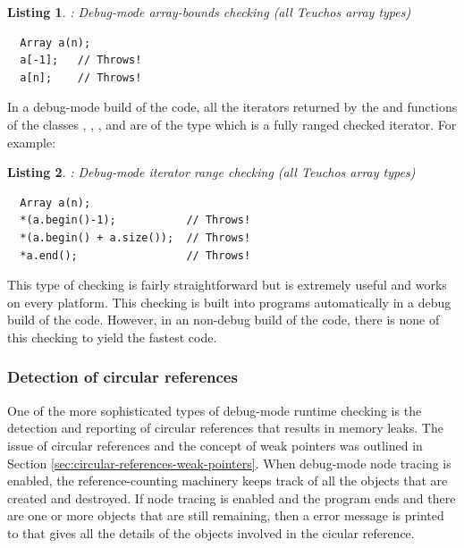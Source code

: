 \documentclass[pdf,ps2pdf,11pt]{SANDreport}
\newtheorem{listing}{Listing}
\begin{document}
\begin{listing}: Debug-mode array-bounds checking (all Teuchos array types) \\
\label{listing:array-bounds-checking}
{\small\begin{verbatim}
  Array a(n);
  a[-1];   // Throws!
  a[n];    // Throws!
\end{verbatim}}
\end{listing}

In a debug-mode build of the code, all the iterators returned by the
{} and {} functions of the classes
{}, {}, {}, and
{} are of the type {} which is a fully
ranged checked iterator.  For example:

\begin{listing}: Debug-mode iterator range checking (all Teuchos array types) \\
\label{listing:iterator-checking}
{\small\begin{verbatim}
  Array a(n);
  *(a.begin()-1);           // Throws!
  *(a.begin() + a.size());  // Throws!
  *a.end();                 // Throws!
\end{verbatim}}
\end{listing}

This type of checking is fairly straightforward but is extremely
useful and works on every platform.  This checking is built into
programs automatically in a debug build of the code.  However, in an
non-debug build of the code, there is none of this checking to yield
the fastest code.


%
{}\subsubsection{Detection of circular references}
\label{sec:detection-circular-references}
%

One of the more sophisticated types of debug-mode runtime checking is
the detection and reporting of circular {} references that
results in memory leaks.  The issue of circular references and the
concept of weak pointers was outlined in Section
{}\ref{sec:circular-references-weak-pointers}.  When debug-mode node
tracing is enabled, the reference-counting machinery keeps track of
all the {} objects that are created and destroyed.  If
node tracing is enabled and the program ends and there are one or more
{} objects that are still remaining, then a error
message is printed to {} that gives all the details
of the objects involved in the cicular reference.
\end{document}
